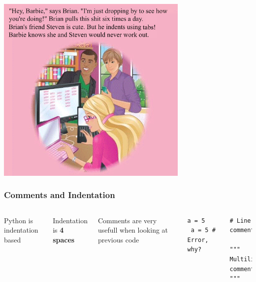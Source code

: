 \documentclass{beamer}
\begin{document}
\begin{frame} 
    \begin{center}
        \includegraphics[width=0.7\textwidth]{images/indents.png}
    \end{center}
\end{frame}

\begin{frame}[fragile]

    \frametitle{Comments and Indentation}

    \begin{columns}[t]


            Python is indentation based

            Indentation is {\bf 4 spaces}

            \bigskip
            \bigskip

            Comments are very usefull when looking at previous code



\begin{lstlisting}
a = 5
 a = 5 # Error, why?

\end{lstlisting}

\begin{lstlisting}
# Line comment

"""
Multiline
comment
"""
\end{lstlisting}

    \end{columns}

\end{frame}
\end{document}
